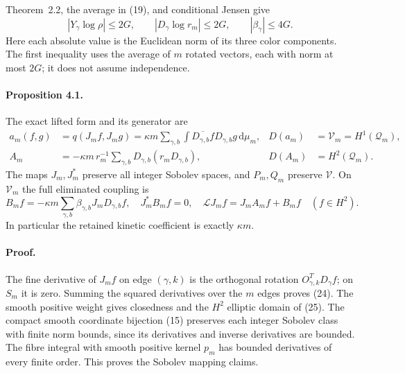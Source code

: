 \documentclass[11pt]{article}
\newcommand{\dd}{\,\mathrm d}
\newcommand{\LL}{\mathscr L}
\newcommand{\VV}{\mathscr V}
\begin{document}
Theorem~2.2, the average in (19), and conditional
Jensen give
\begin{equation}\label{eq:coarsescorebound}
 |Y_\gamma\log\rho|\leq2G,\qquad
 |D_\gamma\log r_m|\leq2G,\qquad |\beta_\gamma|\leq4G.
\end{equation}
Here each absolute value is the Euclidean norm of its three color
components. The first inequality uses the average of $m$ rotated vectors,
each with norm at most $2G$; it does not assume independence.

\paragraph{Proposition 4.1.}
The exact lifted form and its generator are
\begin{align}
 a_m(f,g)&=q(J_mf,J_mg)
    =\kappa m\sum_{\gamma,b}\int\overline{D_{\gamma,b}f}D_{\gamma,b}g\dd\mu_m,
       &D(a_m)&=\VV_m=H^1(\mathcal Q_m),\label{eq:am}\\
 A_m&=-\kappa m\,r_m^{-1}\sum_{\gamma,b}D_{\gamma,b}(r_mD_{\gamma,b}),
       &D(A_m)&=H^2(\mathcal Q_m).\label{eq:Am}
\end{align}
The maps $J_m,J_m^*$ preserve all integer Sobolev spaces, and $P_m,Q_m$
preserve $\VV$. On $\VV_m$ the full eliminated coupling is
\begin{equation}\label{eq:Bm}
 B_mf=-\kappa m\sum_{\gamma,b}\beta_{\gamma,b}J_mD_{\gamma,b}f,
 \quad J_m^*B_mf=0,\quad \LL J_mf=J_mA_mf+B_mf\quad(f\in H^2).
\end{equation}
In particular the retained kinetic coefficient is exactly $\kappa m$.

\paragraph{Proof.}
The fine derivative of $J_mf$ on edge $(\gamma,k)$ is the orthogonal
rotation $O_{\gamma,k}^TD_\gamma f$; on $S_m$ it is zero.
Summing the squared derivatives over the $m$ edges proves (24).
The smooth positive weight gives closedness and the $H^2$ elliptic domain
of (25). The compact smooth coordinate bijection
(15) preserves each integer Sobolev class with
finite norm bounds, since its derivatives and inverse derivatives are
bounded. The fibre integral with smooth positive kernel $p_m$ has bounded
derivatives of every finite order. This proves the Sobolev mapping claims.
\end{document}
